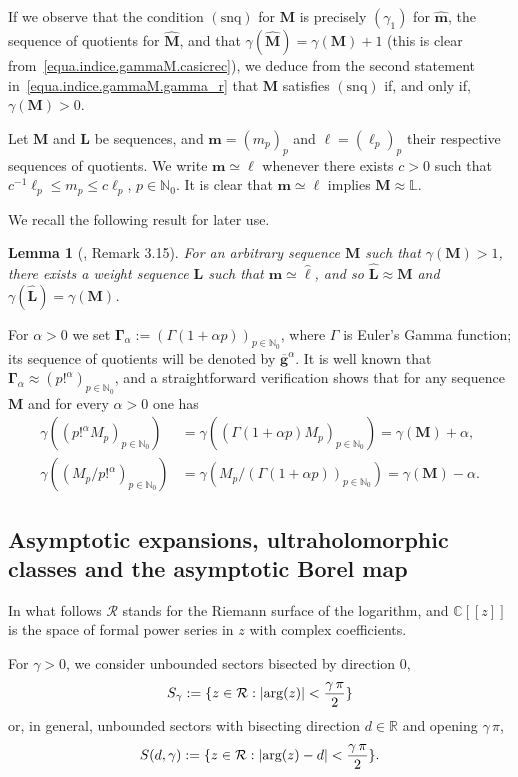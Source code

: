 \documentclass[11pt,a4paper]{article}
\theoremstyle{plain}
\newtheorem{lemma}[theorem]{Lemma}
\theoremstyle{definition}
\numberwithin{equation}{section}
\newcommand{\N}{\mathbb{N}}
\newcommand{\R}{\mathbb{R}}
\newcommand{\C}{\mathbb{C}}
\newcommand{\al}{\alpha}
\newcommand{\m}{{\boldsymbol{m}}}
\newcommand{\bl}{{\boldsymbol{\ell}}}
\newcommand{\M}{{\boldsymbol{M}}}
\newcommand{\bGa}{{\boldsymbol{\Gamma}}}
\newcommand{\LL}{{\boldsymbol{L}}}
\newcommand{\hM}{\widehat{{\boldsymbol{M}}}}
\def\ga{\gamma}
\def\L{\mathbb{L}}
\newcommand{\snq}{\operatorname{(snq)}}
\begin{document}
If we observe that the condition $\snq$ for $\M$ is precisely $(\gamma_1)$ for $\widehat{\m}$, the sequence of quotients for $\hM$, and that $\ga(\hM)=\ga(\M)+1$ (this is clear from~\eqref{equa.indice.gammaM.casicrec}), we deduce from the second statement in~\eqref{equa.indice.gammaM.gamma_r} that
$\M$ satisfies $\snq$ if, and only if, $\ga(\M)>0$.


Let $\M$ and $\LL$ be sequences, and $\m=(m_p)_p$ and $\bl=(\ell_p)_p$ their respective sequences of quotients. We write $\m\simeq\bl$ whenever there exists $c>0$ such that $c^{-1}\ell_p\le m_p\le c\ell_p$, $p\in\N_0$. It is clear that $\m\simeq\bl$ implies $\M\approx\L$.

We recall the following result for later use.

\begin{lemma}[\cite{JimenezSanzSchindlIndex}, Remark 3.15]\label{lemma.gammaMgreaterthan1}
	For an arbitrary sequence $\M$ such that $\gamma(\M)>1$,
	there exists a weight sequence $\LL$ such that $\m\simeq\widehat{\ell}$, and so $\widehat{\LL}\approx\M$ and $\gamma(\widehat{\LL})=\gamma(\M)$.
\end{lemma}

For $\al>0$ we set
$\bGa_{\al}:=(\Gamma(1+\al p))_{p\in\N_0}$, where $\Gamma$ is Euler's Gamma function; its sequence of quotients will be denoted by $\overline{\boldsymbol{g}}^{\al}$.
It is well known that $\bGa_{\al}\approx(p!^{\al})_{p\in\N_0}$, and a straightforward verification shows that for any sequence $\M$ and for every $\al>0$ one has
\begin{align} \gamma((p!^{\al}M_p)_{p\in\N_0})&=\gamma((\Gamma(1+\al p)M_p)_{p\in\N_0})= \gamma(\M)+\al,\label{equa.gamma.producto}\\
\gamma((M_p/p!^{\al})_{p\in\N_0})&=\gamma(M_p/(\Gamma(1+\al p))_{p\in\N_0})= \gamma(\M)-\al.\label{equa.gamma.cociente}
\end{align}


\subsection{Asymptotic expansions, ultraholomorphic classes and the asymptotic Borel map}\label{subsectCarlemanclasses}

In what follows $\mathcal{R}$ stands for the Riemann surface of the logarithm, and $\C[[z]]$ is the space of formal power series in $z$ with complex coefficients.

For $\gamma>0$, we consider unbounded sectors bisected by direction 0,
$$S_{\gamma}:=\{z\in\mathcal{R}:|\hbox{arg}(z)|<\frac{\gamma\,\pi}{2}\}$$
or, in general, unbounded sectors with bisecting direction $d\in\R$ and opening $\ga\,\pi$,
$$S(d,\ga):=\{z\in\mathcal{R}:|\hbox{arg}(z)-d|<\frac{\ga\,\pi}{2}\}.$$
\end{document}

